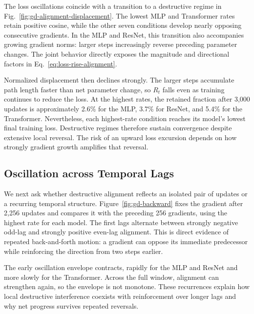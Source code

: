 The loss oscillations coincide with a transition to a destructive
regime in Fig.~\ref{fig:gd-alignment-displacement}. The lowest MLP and
Transformer rates retain positive cosine, while the other seven
conditions develop nearly opposing consecutive gradients. In the MLP
and ResNet, this transition also accompanies growing gradient norms:
larger steps increasingly reverse preceding parameter changes. The
joint behavior directly exposes the magnitude and directional factors
in Eq.~\eqref{eq:loss-rise-alignment}.

Normalized displacement then declines strongly. The larger steps
accumulate path length faster than net parameter change, so $R_t$
falls even as training continues to reduce the loss. At the highest
rates, the retained fraction after 3,000 updates is approximately
2.6\% for the MLP, 3.7\% for ResNet, and 5.4\% for the Transformer.
Nevertheless, each highest-rate condition reaches its model's lowest
final training loss. Destructive regimes therefore sustain convergence
despite extensive local reversal. The risk of an upward loss excursion
depends on how strongly gradient growth amplifies that reversal.

\subsection{Oscillation across Temporal Lags}

We next ask whether destructive alignment reflects an isolated pair
of updates or a recurring temporal structure. Figure~\ref{fig:gd-backward}
fixes the gradient after 2,256 updates and compares it with the preceding
256 gradients, using the highest rate for each model. The first lags
alternate between strongly negative odd-lag and strongly positive
even-lag alignment. This is direct evidence of repeated back-and-forth
motion: a gradient can oppose its immediate predecessor while reinforcing
the direction from two steps earlier.

The early oscillation envelope contracts, rapidly for the MLP and ResNet
and more slowly for the Transformer. Across the full window, alignment
can strengthen again, so the envelope is not monotone. These recurrences
explain how local destructive interference coexists with reinforcement
over longer lags and why net progress survives repeated reversals.
